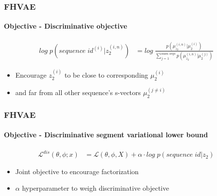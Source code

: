 \documentclass[9pt]{beamer}
\begin{document}
\begin{frame}
\frametitle{FHVAE}
\framesubtitle{Objective - Discriminative objective}
\begin{align*}
log\;p(sequence\;id^{(i)} | z_2^{(i,n)})& = log\;\frac{p(\mu_{z_2}^{(i,n)}|\mu_2^{(i)})}{\sum^{num\;seqs}_{j=1}	p(\mu_{z_2}^{(i,n)}|\mu_2^{(j)})}
\end{align*}
\begin{itemize}
	\item Encourage $z_2^{(i)}$ to be close to corresponding $\mu_2^{(i)}$
	\item and far from all other sequence's s-vectors $\mu_2^{(j \neq i)}$
\end{itemize}
\end{frame} 



\begin{frame}
\frametitle{FHVAE}
\framesubtitle{Objective - Discriminative segment variational lower bound}
\begin{align*}
\mathcal{L}^{dis}(\theta, \phi;x)& = \mathcal{L}(\theta, \phi, X) + \alpha \cdot log\;p(sequence\;id | z_2)
\end{align*}
\begin{itemize}
	\item Joint objective to encourage factorization
	\item $\alpha$ hyperparameter to weigh discriminative objective
\end{itemize}
\end{frame} 
\end{document}
